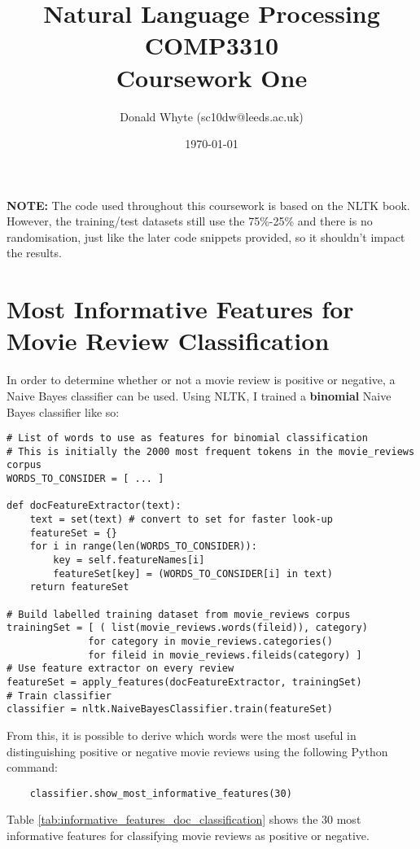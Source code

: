 \documentclass{article}
\title{Natural Language Processing \\ COMP3310 \\ Coursework One}
\author{Donald Whyte (sc10dw@leeds.ac.uk)}
\date{\today}
\begin{document}
\lstset{language=Python}
\lstset{basicstyle=\ttfamily}

\maketitle

\textbf{NOTE:} The code used throughout this coursework is based on the NLTK book. However, the training/test datasets still use the 75\%-25\% and there is no randomisation, just like the later code snippets provided, so it shouldn't impact the results.

\section{Most Informative Features for Movie Review Classification}

In order to determine whether or not a movie review is positive or negative, a Naive Bayes classifier can be used. Using NLTK, I trained a \textbf{binomial} Naive Bayes classifier like so:

\begin{lstlisting}
# List of words to use as features for binomial classification
# This is initially the 2000 most frequent tokens in the movie_reviews corpus
WORDS_TO_CONSIDER = [ ... ]

def docFeatureExtractor(text):
	text = set(text) # convert to set for faster look-up
	featureSet = {}
	for i in range(len(WORDS_TO_CONSIDER)):
		key = self.featureNames[i]
		featureSet[key] = (WORDS_TO_CONSIDER[i] in text)
	return featureSet

# Build labelled training dataset from movie_reviews corpus
trainingSet = [ ( list(movie_reviews.words(fileid)), category)
			  for category in movie_reviews.categories()
			  for fileid in movie_reviews.fileids(category) ] 
# Use feature extractor on every review
featureSet = apply_features(docFeatureExtractor, trainingSet)
# Train classifier 
classifier = nltk.NaiveBayesClassifier.train(featureSet)
\end{lstlisting}

From this, it is possible to derive which words were the most useful in distinguishing positive or negative movie reviews using the following Python command:

\begin{lstlisting}
	classifier.show_most_informative_features(30)
\end{lstlisting}
Table \ref{tab:informative_features_doc_classification} shows the 30 most informative features for classifying movie reviews as positive or negative.
\end{document}
